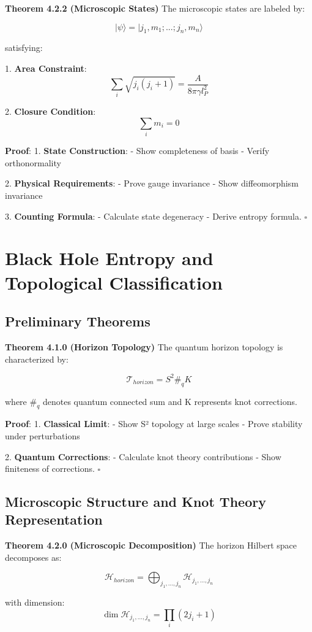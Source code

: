 \documentclass[12pt,a4paper]{article}
\begin{document}
\textbf{Theorem 4.2.2 (Microscopic States)}
The microscopic states are labeled by:

\[
|\psi\rangle = |j_1,m_1;...;j_n,m_n\rangle
\]

satisfying:

1. \textbf{Area Constraint}:
   \[
   \sum_i \sqrt{j_i(j_i+1)} = \frac{A}{8\pi\gamma l_P^2}
   \]

2. \textbf{Closure Condition}:
   \[
   \sum_i m_i = 0
   \]

\textbf{Proof}:
1. \textbf{State Construction}:
   - Show completeness of basis
   - Verify orthonormality

2. \textbf{Physical Requirements}:
   - Prove gauge invariance
   - Show diffeomorphism invariance

3. \textbf{Counting Formula}:
   - Calculate state degeneracy
   - Derive entropy formula. $\square$

\section{Black Hole Entropy and Topological Classification}
\subsection{Preliminary Theorems}

\textbf{Theorem 4.1.0 (Horizon Topology)}
The quantum horizon topology is characterized by:

\[
\mathcal{T}_{horizon} = S^2 \#_q K
\]

where $\#_q$ denotes quantum connected sum and K represents knot corrections.

\textbf{Proof}:
1. \textbf{Classical Limit}:
   - Show S² topology at large scales
   - Prove stability under perturbations

2. \textbf{Quantum Corrections}:
   - Calculate knot theory contributions
   - Show finiteness of corrections. $\square$

\subsection{Microscopic Structure and Knot Theory Representation}

\textbf{Theorem 4.2.0 (Microscopic Decomposition)}
The horizon Hilbert space decomposes as:

\[
\mathcal{H}_{horizon} = \bigoplus_{j_1,...,j_n} \mathcal{H}_{j_1,...,j_n}
\]

with dimension:
\[
\dim \mathcal{H}_{j_1,...,j_n} = \prod_i (2j_i + 1)
\]
\end{document}
